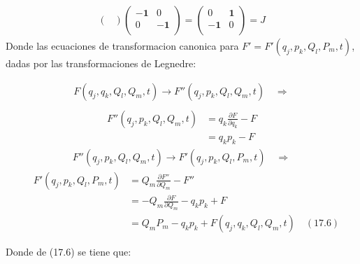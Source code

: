 \documentclass[a4paper]{article}
\begin{document}
\begin{answer}[Punto 3]
\begin{align*}
\begin{pmatrix}
            \end{pmatrix} \begin{pmatrix}
                -\mathbf 1 & 0\\
                0 & -\mathbf 1\\
            \end{pmatrix} = \begin{pmatrix}
                0 & \mathbf 1\\
                -\mathbf 1 & 0\\
            \end{pmatrix} = J
        \end{align*}
        Donde las ecuaciones de transformacion canonica para $ F'= F'(q_j, p_k,Q_l,P_m,t)$, dadas por las transformaciones de Legnedre:

        
        \begin{align*}
            F(q_j, q_k, Q_l, Q_m, t)  \rightarrow F''(q_j, p_k, Q_l, Q_m, t) \quad \Rightarrow\\
        \end{align*} 
        \begin{align*}F''(q_j, p_k, Q_l, Q_m, t) &= q_k \frac{\partial F}{\partial q_k}  - F\\
            &= q_k p_k - F
        \end{align*}
        \begin{align*}
            F''(q_j,p_k,Q_l,Q_m,t) \rightarrow F'(q_j, p_k, Q_l, P_m, t) \quad \Rightarrow 
        \end{align*}
        \begin{align*}
            \quad F'(q_j,p_k,Q_l,P_m,t) &= Q_m \frac{\partial F''}{\partial Q_m}  - F''\\
            &= -Q_m \frac{\partial F}{\partial Q_m}  - q_k p_k + F \\
            &= Q_m P_m - q_k p_k + F(q_j, q_k, Q_l, Q_m, t) \quad (17.6)
        \end{align*}

        Donde de (17.6) se tiene que:


\end{answer}
\end{document}

